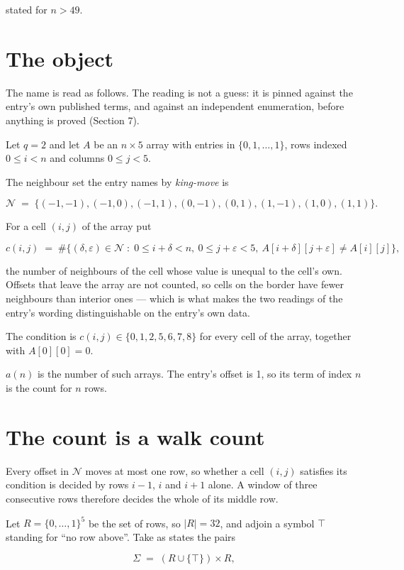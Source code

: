 \documentclass[11pt]{article}
\theoremstyle{definition}
\begin{document}
stated for $n > 49$.

\section{The object}

The name is read as follows. The reading is not a guess: it is pinned against the entry's own published terms, and against an independent enumeration, before anything is proved (Section 7).

Let $q = 2$ and let $A$ be an $n \times 5$ array with entries in $\{0,1,\dots,1\}$, rows indexed $0 \le i < n$ and columns $0 \le j < 5$.

The neighbour set the entry names by {\itshape king-move} is

\[\mathcal{N} \;=\; \{(-1,-1), (-1,0), (-1,1), (0,-1), (0,1), (1,-1), (1,0), (1,1)\}.\]

For a cell $(i,j)$ of the array put

\[c(i,j) \;=\; \#\bigl\{(\delta,\varepsilon)\in\mathcal{N} \;:\; 0\le i+\delta<n,\ 0\le j+\varepsilon<5,\ A[i+\delta][j+\varepsilon] \neq A[i][j]\bigr\},\]

the number of neighbours of the cell whose value is unequal to the cell's own. Offsets that leave the array are not counted, so cells on the border have fewer neighbours than interior ones --- which is what makes the two readings of the entry's wording distinguishable on the entry's own data.

The condition is $c(i,j) \in \{0, 1, 2, 5, 6, 7, 8\}$ for every cell of the array, together with $A[0][0]=0$.

$a(n)$ is the number of such arrays. The entry's offset is 1, so its term of index $n$ is the count for $n$ rows.

\section{The count is a walk count}

Every offset in $\mathcal{N}$ moves at most one row, so whether a cell $(i,j)$ satisfies its condition is decided by rows $i-1$, $i$ and $i+1$ alone. A window of three consecutive rows therefore decides the whole of its middle row.

Let $R = \{0,\dots,1\}^{5}$ be the set of rows, so $|R| = 32$, and adjoin a symbol $\top$ standing for ``no row above''. Take as states the pairs

\[\Sigma \;=\; (R \cup \{\top\}) \times R,\]
\end{document}

